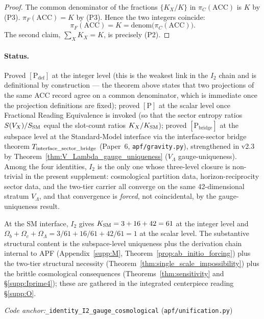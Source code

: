 \documentclass[11pt]{article}
\theoremstyle{plain}
\theoremstyle{definition}
\theoremstyle{remark}
\newcommand{\coderef}[2]{\par\noindent\textit{Code anchor:}\quad\texttt{#1} (\texttt{#2})}
\begin{document}
\begin{proof}
The common denominator of the fractions $\{K_X / K\}$ in $\pi_C(\mathrm{ACC})$ is $K$ by (P3).  $\pi_F(\mathrm{ACC}) = K$ by (P3).  Hence the two integers coincide:
\[
  \pi_F(\mathrm{ACC}) = K = \mathrm{denom}\bigl(\pi_C(\mathrm{ACC})\bigr).
\]
The second claim, $\sum_X K_X = K$, is precisely (P2).
\end{proof}

\paragraph{Status.}
Proved $[\text{P}_{\mathrm{def}}]$ at the integer level (this is the weakest link in the $I_2$ chain and is definitional by construction --- the theorem above states that two projections of the same ACC record agree on a common denominator, which is immediate once the projection definitions are fixed); proved $[\text{P}]$ at the scalar level once Fractional Reading Equivalence is invoked (so that the sector entropy ratios $S(V_X) / S_{\rm SM}$ equal the slot-count ratios $K_X / K_{\rm SM}$); proved $[\text{P}_{\mathrm{bridge}}]$ at the subspace level at the Standard-Model interface via the interface-sector bridge theorem $T_{\rm interface\_sector\_bridge}$ (Paper~6, \texttt{apf/gravity.py}), strengthened in v2.3 by Theorem~\ref{thm:V_Lambda_gauge_uniqueness} ($V_\Lambda$ gauge-uniqueness).  Among the four identities, $I_2$ is the only one whose three-level closure is non-trivial in the present supplement: cosmological partition data, horizon-reciprocity sector data, and the two-tier carrier all converge on the same 42-dimensional stratum $V_\Lambda$, and that convergence is \emph{forced}, not coincidental, by the gauge-uniqueness result.

At the SM interface, $I_2$ gives $K_{\rm SM} = 3 + 16 + 42 = 61$ at the integer level and $\Omega_b + \Omega_c + \Omega_\Lambda = 3/61 + 16/61 + 42/61 = 1$ at the scalar level.  The substantive structural content is the subspace-level uniqueness plus the derivation chain internal to APF (Appendix~\ref{supp:M}, Theorem~\ref{prop:ab_initio_forcing}) plus the two-tier structural necessity (Theorem~\ref{thm:single_scale_impossibility}) plus the brittle cosmological consequences (Theorems~\ref{thm:sensitivity} and \S\ref{supp:Iprime4}); these are gathered in the integrated centerpiece reading \S\ref{supp:O}.

\coderef{\_identity\_I2\_gauge\_cosmological}{apf/unification.py}

\bigskip
\end{document}
